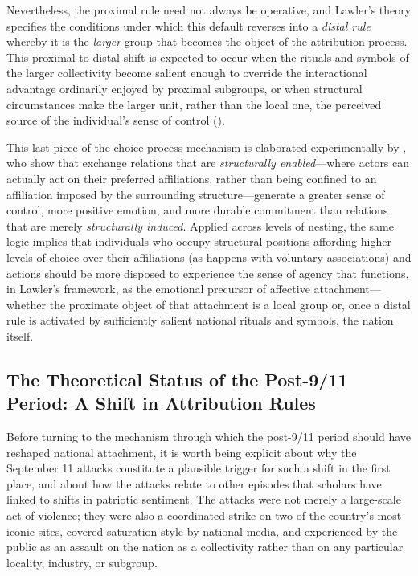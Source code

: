 \documentclass[12pt,letterpaper]{article}
\begin{document}
Nevertheless, the proximal rule need not always be operative, and Lawler's \citeyearpar{lawler1992affective-8c8} theory specifies the conditions under which this default reverses into a \textit{distal rule} whereby it is the \textit{larger} group that becomes the object of the attribution process. This proximal-to-distal shift is expected to occur when the rituals and symbols of the larger collectivity become salient enough to override the interactional advantage ordinarily enjoyed by proximal subgroups, or when structural circumstances make the larger unit, rather than the local one, the perceived source of the individual's sense of control (\citealp[pp.~610--620]{lawler1992affective-8c8}). 

This last piece of the choice-process mechanism is elaborated experimentally by \citet{lawler2006commitment-b3a}, who show that exchange relations that are \textit{structurally enabled}---where actors can actually act on their preferred affiliations, rather than being confined to an affiliation imposed by the surrounding structure---generate a greater sense of control, more positive emotion, and more durable commitment than relations that are merely \textit{structurally induced}. Applied across levels of nesting, the same logic implies that individuals who occupy structural positions affording higher levels of choice over their affiliations (as happens with voluntary associations) and actions should be more disposed to experience the sense of agency that functions, in Lawler's framework, as the emotional precursor of affective attachment---whether the proximate object of that attachment is a local group or, once a distal rule is activated by sufficiently salient national rituals and symbols, the nation itself.

\subsection{The Theoretical Status of the Post-9/11 Period: A Shift in Attribution Rules}

Before turning to the mechanism through which the post-9/11 period should have reshaped national attachment, it is worth being explicit about why the September 11 attacks constitute a plausible trigger for such a shift in the first place, and about how the attacks relate to other episodes that scholars have linked to shifts in patriotic sentiment. The attacks were not merely a large-scale act of violence; they were also a coordinated strike on two of the country's most iconic sites, covered saturation-style by national media, and experienced by the public as an assault on the nation as a collectivity rather than on any particular locality, industry, or subgroup. 
\end{document}
